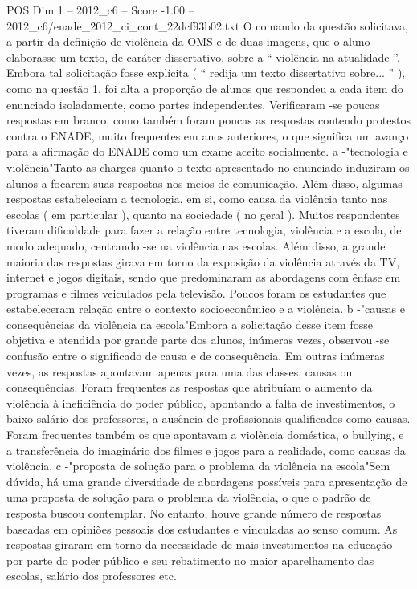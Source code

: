 \begin{textsample}{POS Dim 1 – 2012\_c6 – Score -1.00 – 2012\_c6/enade\_2012\_ci\_cont\_22dcf93b02.txt}
O comando da questão solicitava, a partir da definição de violência da OMS e de duas imagens, que o aluno elaborasse um texto, de caráter dissertativo, sobre a “ violência na atualidade ”.
Embora tal solicitação fosse explícita ( “ redija um texto dissertativo sobre... ” ), como na questão 1, foi alta a proporção de alunos que respondeu a cada item do enunciado isoladamente, como partes independentes.
Verificaram -se poucas respostas em branco, como também foram poucas as respostas contendo protestos contra o ENADE, muito frequentes em anos anteriores, o que significa um avanço para a afirmação do ENADE como um exame aceito socialmente. a -"tecnologia e violência"Tanto as charges quanto o texto apresentado no enunciado induziram os alunos a focarem suas respostas nos meios de comunicação.
Além disso, algumas respostas estabeleciam a tecnologia, em si, como causa da violência tanto nas escolas ( em particular ), quanto na sociedade ( no geral ).
Muitos respondentes tiveram dificuldade para fazer a relação entre tecnologia, violência e a escola, de modo adequado, centrando -se na violência nas escolas.
Além disso, a grande maioria das respostas girava em torno da exposição da violência através da TV, internet e jogos digitais, sendo que predominaram as abordagens com ênfase em programas e filmes veiculados pela televisão.
Poucos foram os estudantes que estabeleceram relação entre o contexto socioeconômico e a violência. b -"causas e consequências da violência na escola"Embora a solicitação desse item fosse objetiva e atendida por grande parte dos alunos, inúmeras vezes, observou -se confusão entre o significado de causa e de consequência.
Em outras inúmeras vezes, as respostas apontavam apenas para uma das classes, causas ou consequências.
Foram frequentes as respostas que atribuíam o aumento da violência à ineficiência do poder público, apontando a falta de investimentos, o baixo salário dos professores, a ausência de profissionais qualificados como causas.
Foram frequentes também os que apontavam a violência doméstica, o bullying, e a transferência do imaginário dos filmes e jogos para a realidade, como causas da violência. c -"proposta de solução para o problema da violência na escola"Sem dúvida, há uma grande diversidade de abordagens possíveis para apresentação de uma proposta de solução para o problema da violência, o que o padrão de resposta buscou contemplar.
No entanto, houve grande número de respostas baseadas em opiniões pessoais dos estudantes e vinculadas ao senso comum.
As respostas giraram em torno da necessidade de mais investimentos na educação por parte do poder público e seu rebatimento no maior aparelhamento das escolas, salário dos professores etc.

\end{textsample}
